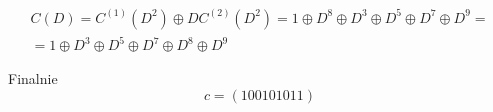 \documentclass[12pt]{article}
\begin{document}
    \begin{multline*}
    C(D) = C^{(1)}(D^2) \oplus DC^{(2)}(D^2) = 1\oplus D^8 \oplus D^3 \oplus D^5 \oplus D^7 \oplus D^9 = \\
    = 1 \oplus D^3 \oplus D^5 \oplus D^7 \oplus D^8 \oplus D^9 
    \end{multline*}

    Finalnie 
    $$c = (100101011) $$

    
\end{document}
